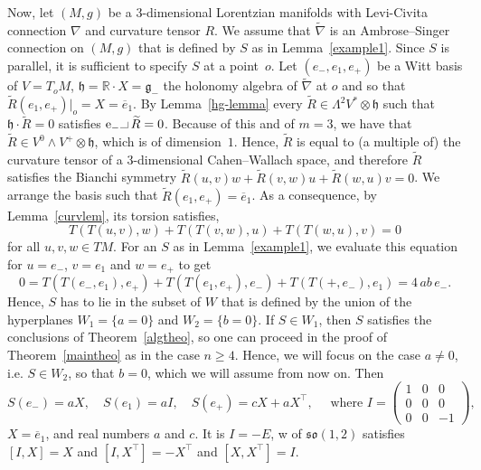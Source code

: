 \documentclass[11pt,a4paper]{amsart}
\newcommand{\tnab}{\widetilde{\nabla}}
\newcommand{\tR}{\widetilde{R}}
\newcommand{\g}{\mathfrak{g}}
\newcommand{\h}{\mathfrak{h}}
\newcommand{\+}{\oplus}
\newcommand{\so}{\mathfrak{so}}
\newcommand{\hook}{\makebox[7pt]{\rule{6pt}{.3pt}\rule{.3pt}{5pt}}\,}
\newcommand{\1}{\mathbf{1}}
\newcommand{\e}{\mathrm{e}}
\newcommand{\R}{\mathbb{R}} %
\newcommand{\<}{\langle}
\renewcommand{\>}{\rangle}
\theoremstyle{definition}
\theoremstyle{plain}
\numberwithin{equation}{section}
\begin{document}
Now, let  $(M,g)$ be a $3$-dimensional Lorentzian manifolds with Levi-Civita connection $\nabla$ and curvature tensor $R$. We 
 assume that $\tnab$ is an Ambrose--Singer connection on $(M,g)$ that is defined by $S$ as in Lemma~\ref{example1}. Since $S$ is parallel, it is sufficient to specify $S$ at a point~$o$.
  Let $(e_-,e_1,e_+)$ be a Witt basis of $V=T_oM$, $\h=\R\cdot X=\g_-$ the holonomy algebra of $\tnab$ at $o$ and so that $\tR(e_1,e_+)|_o=X=\overline{e}_1$. 
 By  Lemma~\ref{hg-lemma} every $\tR\in \Lambda^2 V^*\otimes \h$ such that $\h\cdot \tR=0$ satisfies $\e_-\hook \tR=0$. Because of this and of $m=3$, we have that $\tR\in V^0\wedge V^+\otimes \h$, which is of dimension~$1$. Hence, $\tR$ is equal to  (a multiple of) the curvature tensor of a $3$-dimensional Cahen--Wallach space, and therefore
$\tR$ satisfies the Bianchi symmetry $\tR(u,v)w+\tR(v,w)u+\tR(w,u)v=0$. We arrange the basis such that $\tR(e_1,e_+)=\overline{e}_1$. 
As a consequence, by Lemma~\ref{curvlem}, its torsion satisfies,
\[T(T(u,v),w)+ T(T(v,w),u)+T(T(w,u),v)=0\] for all $u,v,w\in TM$.
For an $S$ as in  Lemma~\ref{example1}, we evaluate this equation for $u=e_-$, $v=e_1$ and $w=e_+$ to get
\[0=T(T(e_-,e_1),e_+)+ T(T(e_1,e_+),e_-)+T(T(+,e_-),e_1)=4\, ab\,e_-.\] 
Hence, $S$ has to lie in the subset of $W$ that is defined by the union of the hyperplanes $W_1=\{a=0\}$ and $W_2=\{b=0\}$. 
If $S\in W_1$, then $S$ satisfies the conclusions of Theorem~\ref{algtheo}, so one can proceed in the  proof of Theorem~\ref{maintheo} as in the case $n\ge 4$. Hence, we will focus on the case $a\not=0$, i.e. 
 $S\in W_2$, so that $b=0$, which we will assume from now on. Then 
\begin{equation}\label{counterS}
S(e_-)=a X,
\quad 
S(e_1)= 
a I,
\quad
S(e_+)= 
cX+aX^\top,\quad \text{ where } I= \begin{pmatrix}
1&0&0\\ 0&0&0 \\0&0&-1\end{pmatrix},
\end{equation}
$X=\overline{e}_1$, and real numbers $a$ and $c$. It is $I=-E$, w of $\so(1,2)$  satisfies $[I,X]=X$ and $[I,X^\top]=-X^\top$ and $[X,X^\top]=I$. 
\end{document}
